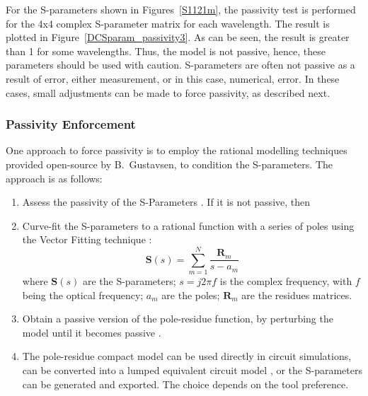 \documentclass[journal]{spie}
\begin{document}
For the S-parameters shown in Figures~\ref{S1121m}, the passivity test is performed for the 4x4 complex S-parameter matrix for each wavelength.  The result is plotted in Figure~\ref{DCSparam_passivity3}.  As can be seen, the result is greater than 1 for some wavelengths.  Thus, the model is not passive, hence, these parameters should be used with caution.  S-parameters are often not passive as a result of error, either measurement, or in this case, numerical, error.  In these cases, small adjustments can be made to force passivity, as described next.


\subsubsection{Passivity Enforcement}

One approach to force passivity is to employ the rational modelling techniques provided open-source by B.~Gustavsen, to condition the S-parameters.  The approach is as follows:

\begin{enumerate}
	\item Assess the passivity of the S-Parameters \cite{gustavsen2008fast}.  If it is not passive, then
	\item Curve-fit the S-parameters to a rational function with a series of poles using the Vector Fitting technique \cite{gustavsen1999rational,gustavsen2006improving, deschrijver2008macromodeling}:
		\begin{equation}
			\mathbf{S}(s) = \sum_{m=1}^N \frac{\mathbf{R}_m}{s-a_m}
			\label{EQ-VF}
		\end{equation}
		where $\mathbf{S}(s)$ are the S-parameters; $s=j 2 \pi f$ is the complex frequency, with $f$ being the optical frequency; $a_m$ are the poles; $\mathbf{R}_m$ are the residues matrices.
	\item Obtain a passive version of the pole-residue function, by perturbing the model until it becomes passive \cite{gustavsen2010fast}.
	\item The pole-residue compact model can be used directly in circuit simulations, can be converted into a lumped equivalent circuit model \cite{gustavsen2002computer}, or the S-parameters can be generated and exported.  The choice depends on the tool preference.  
	
\end{enumerate} 

\end{document}

